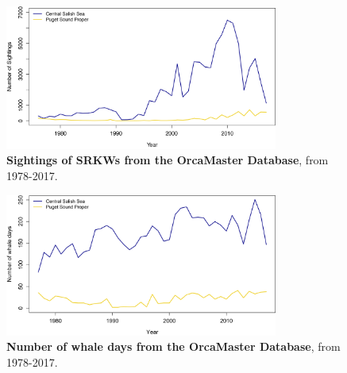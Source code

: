 \documentclass{article}
\begin{document}
\begin{figure}[!hp]
\includegraphics[width=0.8\textwidth]{../analyses/figures/OrcaPhenPlots/numsights_1976_2regs.png} 
\caption{\textbf{Sightings of SRKWs from the OrcaMaster Database}, from 1978-2017. }
\label{fig:sights}
\end{figure}

\begin{figure}[!hp]
\includegraphics[width=0.8\textwidth]{../analyses/figures/OrcaPhenPlots/whaledays_assumeSRKW2regs.png} 
\caption{\textbf{Number of whale days from the OrcaMaster Database}, from 1978-2017. }
\label{fig:wdays}
\end{figure}
\end{document}
